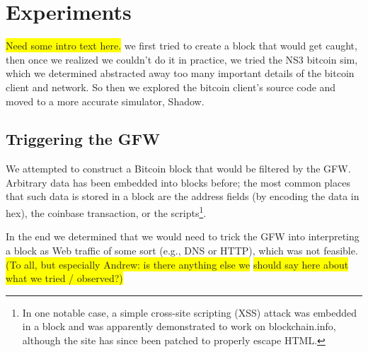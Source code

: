 \section{Experiments}
\colorbox{yellow}{Need some intro text here.}
we first tried to create a block that would get caught, then once we realized we couldn't do it in practice, we tried the NS3 bitcoin sim, which we determined abstracted away too many important details of the bitcoin client and network. So then we explored the bitcoin client's source code and moved to a more accurate simulator, Shadow.

\subsection{Triggering the GFW}
We attempted to construct a Bitcoin block that would be filtered by the GFW. Arbitrary data has been embedded into blocks before; the most common places that such data is stored in a block are the address fields (by encoding the data in hex), the coinbase transaction, or the scripts\footnote{In one notable case, a simple cross-site scripting (XSS) attack was embedded in a block and was apparently demonstrated to work on blockchain.info\cite{reddit}, although the site has since been patched to properly escape HTML.}. 

In the end we determined that we would need to trick the GFW into interpreting a block as Web traffic of some sort (e.g., DNS or HTTP), which was not feasible. \colorbox{yellow}{(To all, but especially Andrew: is there anything else we}
\colorbox{yellow}{should say here about what we tried / observed?)}



